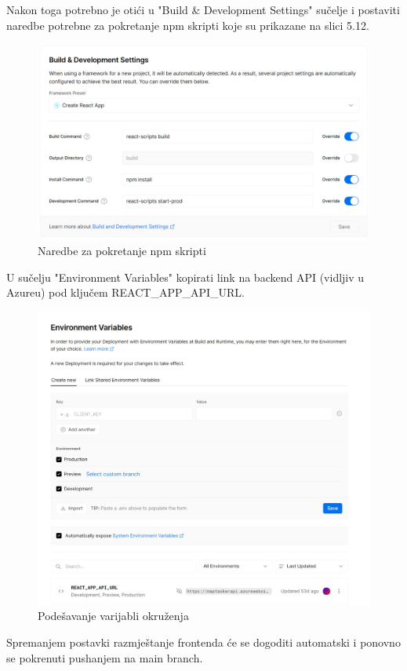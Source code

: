 			\vspace{20mm}
	
			\noindent Nakon toga potrebno je otići u "Build \& Development Settings" sučelje i postaviti naredbe potrebne za pokretanje npm skripti koje su prikazane na slici 5.12.
	
			\vspace{10mm}
	
			\begin{figure}[H]
				 \includegraphics[width=\linewidth]{./slike/front2.jpg}
				  \centering
				  \caption{Naredbe za pokretanje npm skripti}
			  \end{figure}
	
			\vspace{20mm}
	
			\noindent U sučelju "Environment Variables" kopirati link na backend API (vidljiv u Azureu) pod ključem REACT\_APP\_API\_URL.
	
			\vspace{10mm}
	
			\begin{figure}[H]
				 \includegraphics[width=\linewidth]{./slike/front3.jpg}
				  \centering
				  \caption{Podešavanje varijabli okruženja}
			  \end{figure}
	
			  \vspace{20mm}
	
			  \noindent Spremanjem postavki razmještanje frontenda će se dogoditi automatski i ponovno se pokrenuti pushanjem na main branch. 
	\eject 
	

